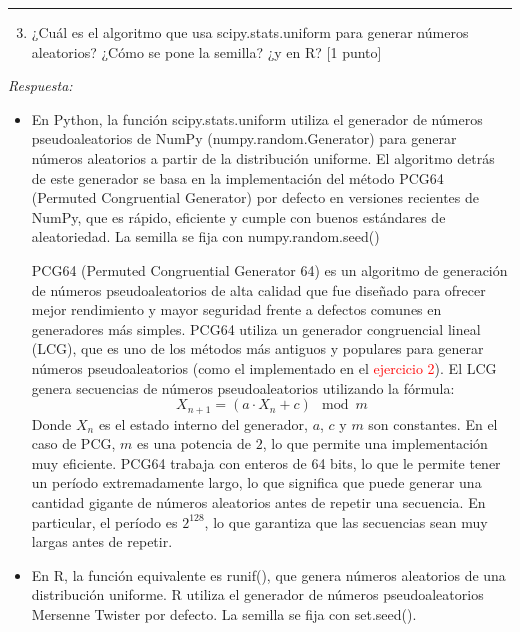 \vspace{5mm}
{\color{lightgray} \hrule}
\begin{enumerate} \setcounter{enumi}{2}
	\item ¿Cuál es el algoritmo que usa scipy.stats.uniform para generar números aleatorios? ¿Cómo se pone la semilla? ¿y en R? [1 punto]
\end{enumerate}

\textcolor{BrickRed}{\it Respuesta:}

\begin{itemize}

\item En Python, la función scipy.stats.uniform utiliza el generador de números pseudoaleatorios de NumPy (numpy.random.Generator) para generar números aleatorios a partir de la distribución uniforme. El algoritmo detrás de este generador se basa en la implementación del método PCG64 (Permuted Congruential Generator) por defecto en versiones recientes de NumPy, que es rápido, eficiente y cumple con buenos estándares de aleatoriedad. La semilla se fija con numpy.random.seed()

PCG64 (Permuted Congruential Generator 64) es un algoritmo de generación de números pseudoaleatorios de alta calidad que fue diseñado para ofrecer mejor rendimiento y mayor seguridad frente a defectos comunes en generadores más simples. PCG64 utiliza un generador congruencial lineal (LCG), que es uno de los métodos más antiguos y populares para generar números pseudoaleatorios (como el implementado en el \textcolor{red}{ejercicio 2}). El LCG genera secuencias de números pseudoaleatorios utilizando la fórmula:
$$
X_{n+1} = (a \cdot X_n + c) \mod m
$$
Donde $X_n$ es el estado interno del generador, $a$, $c$ y $m$ son constantes. En el caso de PCG, $m$ es una potencia de $2$, lo que permite una implementación muy eficiente. PCG64 trabaja con enteros de 64 bits, lo que le permite tener un período extremadamente largo, lo que significa que puede generar una cantidad gigante de números aleatorios antes de repetir una secuencia. En particular, el período es $2^{128}$, lo que garantiza que las secuencias sean muy largas antes de repetir.

\item En R, la función equivalente es runif(), que genera números aleatorios de una distribución uniforme. R utiliza el generador de números pseudoaleatorios Mersenne Twister por defecto. La semilla se fija con set.seed().


\end{itemize}
